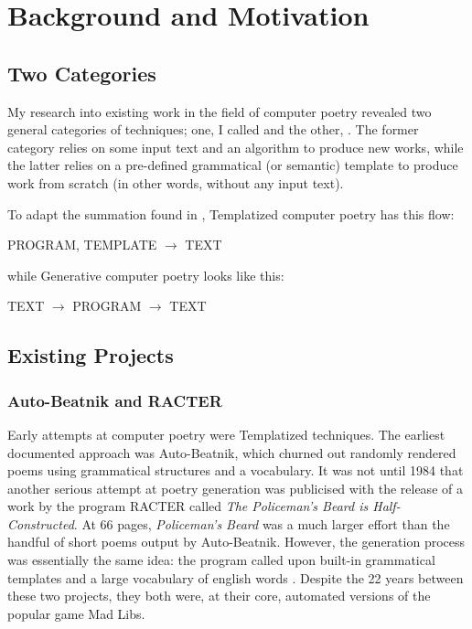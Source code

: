 \documentclass[10pt]{article}
\begin{document}
\section{Background and Motivation}
\subsection{Two Categories}
My research into existing work in the field of computer poetry revealed two
general categories of techniques; one, I called  and the other,
. The former category relies on some input text and an
algorithm to produce new works, while the latter relies on a pre-defined
grammatical (or semantic) template to produce work from scratch (in other
words, without any input text).  

To adapt the summation found in \cite{Hart96}, Templatized computer poetry has this flow:
\begin{center}
\begin{boxed}
PROGRAM, TEMPLATE $\rightarrow$ TEXT
\end{boxed}
\end{center}
while Generative computer poetry looks like this:
\begin{center}
\begin{boxed}
TEXT $\rightarrow$ PROGRAM $\rightarrow$ TEXT
\end{boxed}
\end{center}

\subsection{Existing Projects}
\subsubsection{Auto-Beatnik and RACTER}
Early attempts at computer poetry were Templatized techniques. The earliest
documented approach was Auto-Beatnik, which churned out randomly rendered poems
using grammatical structures and a vocabulary.  It was not until 1984 that
another serious attempt at poetry generation was publicised with the release of
a work by the program RACTER called \emph{The Policeman's Beard is
Half-Constructed}. At 66 pages, \emph{Policeman's Beard} was a much larger
effort than the handful of short poems output by Auto-Beatnik. However, the
generation process was essentially the same idea: the program called upon
built-in grammatical templates and a large vocabulary of english words
\cite{Chamb84}. Despite the 22 years between these two projects, they both
were, at their core, automated versions of the popular game Mad Libs.
\end{document}
